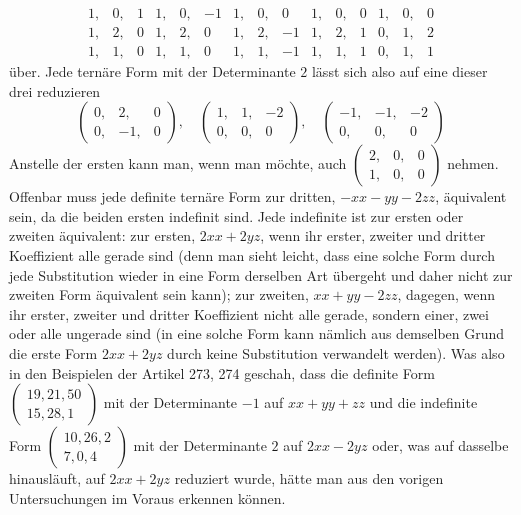 \[
\begin{array}{rrr|rrr|rrr|rrr|rrr}
1,&0,&1&1,&0,&-1&1,&0,&0&1,&0,&0&1,&0,&0\\
1,&2,&0&1,&2,&0&1,&2,&-1&1,&2,&1&0,&1,&2\\
1,&1,&0&1,&1,&0&1,&1,&-1&1,&1,&1&0,&1,&1
\end{array}
\]
über. Jede ternäre Form mit der Determinante \(2\) lässt sich also auf eine dieser drei reduzieren
\[
\left(\begin{smallmatrix}0,&2,&0\\0,&-1,&0\end{smallmatrix}\right),\quad
\left(\begin{smallmatrix}1,&1,&-2\\0,&0,&0\end{smallmatrix}\right),\quad
\left(\begin{smallmatrix}-1,&-1,&-2\\0,&0,&0\end{smallmatrix}\right)
\]
Anstelle der ersten kann man, wenn man möchte, auch \(\left(\begin{smallmatrix}2,&0,&0\\1,&0,&0\end{smallmatrix}\right)\) nehmen. Offenbar muss jede definite ternäre Form zur dritten, \(-xx-yy-2zz\), äquivalent sein, da die beiden ersten indefinit sind. Jede indefinite ist zur ersten oder zweiten äquivalent: zur ersten, \(2xx+2yz\), wenn ihr erster, zweiter und dritter Koeffizient alle gerade sind (denn man sieht leicht, dass eine solche Form durch jede Substitution wieder in eine Form derselben Art übergeht und daher nicht zur zweiten Form äquivalent sein kann); zur zweiten, \(xx+yy-2zz\), dagegen, wenn ihr erster, zweiter und dritter Koeffizient nicht alle gerade, sondern einer, zwei oder alle ungerade sind (in eine solche Form kann nämlich aus demselben Grund die erste Form \(2xx+2yz\) durch keine Substitution verwandelt werden).
Was also in den Beispielen der Artikel 273, 274 geschah, dass die definite Form
$\left(\begin{smallmatrix}19,21,50\\15,28,1\end{smallmatrix}\right)$
mit der Determinante $-1$ auf $xx+yy+zz$ und die indefinite Form
$\left(\begin{smallmatrix}10,26,2\\7,0,4\end{smallmatrix}\right)$
mit der Determinante $2$ auf $2xx-2yz$ oder, was auf dasselbe hinausläuft, auf $2xx+2yz$ reduziert wurde, hätte man aus den vorigen Untersuchungen im Voraus erkennen können.

